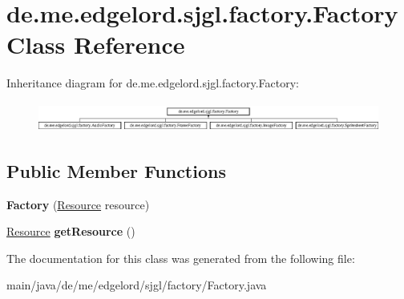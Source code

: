 \hypertarget{classde_1_1me_1_1edgelord_1_1sjgl_1_1factory_1_1_factory}{}\section{de.\+me.\+edgelord.\+sjgl.\+factory.\+Factory Class Reference}
\label{classde_1_1me_1_1edgelord_1_1sjgl_1_1factory_1_1_factory}
Inheritance diagram for de.\+me.\+edgelord.\+sjgl.\+factory.\+Factory\+:\begin{figure}[H]
\begin{center}
\leavevmode
\includegraphics[height=0.979021cm]{classde_1_1me_1_1edgelord_1_1sjgl_1_1factory_1_1_factory}
\end{center}
\end{figure}
\subsection*{Public Member Functions}
\begin{DoxyCompactItemize}
\item 
\mbox{\label{classde_1_1me_1_1edgelord_1_1sjgl_1_1factory_1_1_factory_a46d29feeffe29fffb4b31684a0b26add}} 
{\bfseries Factory} (\mbox{\hyperlink{interfacede_1_1me_1_1edgelord_1_1sjgl_1_1resource_1_1_resource}{Resource}} resource)
\item 
\mbox{\label{classde_1_1me_1_1edgelord_1_1sjgl_1_1factory_1_1_factory_a8c43793ef905a19f43368e2beac333b1}} 
\mbox{\hyperlink{interfacede_1_1me_1_1edgelord_1_1sjgl_1_1resource_1_1_resource}{Resource}} {\bfseries get\+Resource} ()
\end{DoxyCompactItemize}


The documentation for this class was generated from the following file\+:\begin{DoxyCompactItemize}
\item 
main/java/de/me/edgelord/sjgl/factory/Factory.\+java\end{DoxyCompactItemize}
